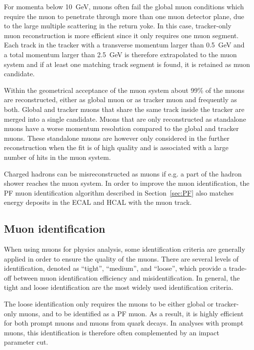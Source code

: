 For momenta below \SI{10}{GeV}, muons often fail the global muon conditions which require the muon to penetrate through more than one muon detector plane, due to the large multiple scattering in the return yoke. In this case, tracker-only muon reconstruction is more efficient since it only requires one muon segment. Each track in the tracker with a transverse momentum larger than \SI{0.5}{GeV} and a total momentum larger than \SI{2.5}{GeV} is therefore extrapolated to the muon system and if at least one matching track segment is found, it is retained as muon candidate.

Within the geometrical acceptance of the muon system about 99\% of the muons are reconstructed, either as global muon or as tracker muon and frequently as both. Global and tracker muons that share the same track inside the tracker are merged into a single candidate. Muons that are only reconstructed as standalone muons have a worse momentum resolution compared to the global and tracker muons. These standalone muons are however only considered in the further reconstruction when the fit is of high quality and is associated with a large number of hits in the muon system.

Charged hadrons can be misreconstructed as muons if e.g. a part of the hadron shower reaches the muon system. In order to improve the muon identification, the \ac{PF} muon identification algorithm described in Section~\ref{sec:PF} also matches energy deposits in the \ac{ECAL} and \ac{HCAL} with the muon track.

\subsection{Muon identification}
\label{sec:muonID}

When using muons for physics analysis, some identification criteria are generally applied in order to ensure the quality of the muons. There are several levels of identification, denoted as ``tight'', ``medium'', and ``loose'', which provide a trade-off between muon identification efficiency and misidentification. In general, the tight and loose identification are the most widely used identification criteria.

The loose identification only requires the muons to be either global or tracker-only muons, and to be identified as a \ac{PF} muon. As a result, it is highly efficient for both prompt muons and muons from quark decays. In analyses with prompt muons, this identification is therefore often complemented by an impact parameter cut.


